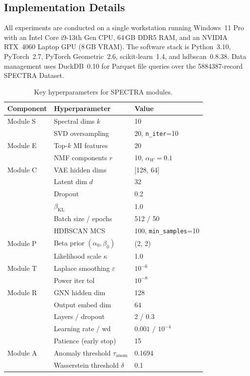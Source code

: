\documentclass[journal]{IEEEtran}
\newcommand{\spectra}{\textsc{SPECTRA}}
\begin{document}
\subsection{Implementation Details}
\label{subsec:implementation}

All experiments are conducted on a single workstation running Windows~11 Pro
with an Intel Core i9-13th Gen CPU, 64\,GB DDR5 RAM, and an NVIDIA RTX~4060
Laptop GPU (8\,GB VRAM).  The software stack is Python~3.10, PyTorch~2.7,
PyTorch Geometric~2.6, scikit-learn~1.4, and hdbscan~0.8.38.
Data management uses DuckDB~0.10 for Parquet file queries over the
\num{5884387}-record SPECTRA Dataset.

\begin{table}[t]
  \renewcommand{\arraystretch}{1.12}
  \caption{Key hyperparameters for \spectra{} modules.}
  \label{tab:hyperparams}
  \centering
  \small
  \begin{tabular}{@{}lll@{}}
    \toprule
    \textbf{Component} & \textbf{Hyperparameter} & \textbf{Value} \\
    \midrule
    Module S  & Spectral dims $k$ & 10 \\
              & SVD oversampling  & 20, \texttt{n\_iter}=10 \\
    Module E  & Top-$k$ MI features & 20 \\
              & NMF components $r$ & 10, $\alpha_W=0.1$ \\
    Module C  & VAE hidden dims & [128, 64] \\
              & Latent dim $d$ & 32 \\
              & Dropout & 0.2 \\
              & $\beta_{\mathrm{KL}}$ & 1.0 \\
              & Batch size / epochs & 512 / 50 \\
              & HDBSCAN MCS & 100, \texttt{min\_samples}=10 \\
    Module P  & Beta prior $(\alpha_0,\beta_0)$ & (2, 2) \\
              & Likelihood scale $\kappa$ & 1.0 \\
    Module T  & Laplace smoothing $\varepsilon$ & $10^{-6}$ \\
              & Power iter tol & $10^{-8}$ \\
    Module R  & GNN hidden dim & 128 \\
              & Output embed dim & 64 \\
              & Layers / dropout & 2 / 0.3 \\
              & Learning rate / wd & $0.001$ / $10^{-4}$ \\
              & Patience (early stop) & 15 \\
    Module A  & Anomaly threshold $\tau_{\mathrm{anom}}$ & 0.1694 \\
              & Wasserstein threshold $\delta$ & 0.1 \\
    \bottomrule
  \end{tabular}
\end{table}
\end{document}
